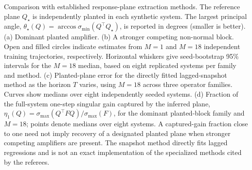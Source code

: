 \caption{Comparison with established response-plane extraction methods. The reference plane $Q_\star$ is independently planted in each synthetic system. The largest principal angle, $\theta_\star(Q)=\arccos\sigma_{\min}(Q^\top Q_\star)$, is reported in degrees (smaller is better). (a) Dominant planted amplifier. (b) A stronger competing non-normal block. Open and filled circles indicate estimates from $M=1$ and $M=18$ independent training trajectories, respectively. Horizontal whiskers give seed-bootstrap 95\% intervals for the $M=18$ median, based on eight replicated systems per family and method. (c) Planted-plane error for the directly fitted lagged-snapshot method as the horizon $T$ varies, using $M=18$ across three operator families. Curves show medians over eight independently seeded systems. (d) Fraction of the full-system one-step singular gain captured by the inferred plane, $\eta_1(Q)=\sigma_{\max}(Q^\top FQ)/\sigma_{\max}(F)$, for the dominant planted-block family and $M=18$; points denote medians over eight systems. A captured-gain fraction close to one need not imply recovery of a designated planted plane when stronger competing amplifiers are present. The snapshot method directly fits lagged regressions and is not an exact implementation of the specialized methods cited by the referees.}
